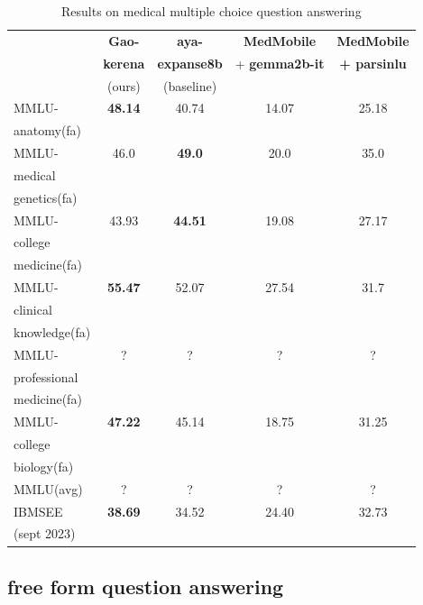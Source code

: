 \documentclass[conference]{IEEEtran}
\begin{document}
\begin{table}[ht]
	\centering
	\caption{Results on medical multiple choice question answering}
	\begin{tabular}{|l|c|c|c|c|}  %
		\hline
		\textbf{} & \textbf{Gao-} & \textbf{aya-}
		 & \textbf{MedMobile} & \textbf{MedMobile} \\ 
		 & \textbf{kerena} & \textbf{expanse8b} & + \textbf{gemma2b-it} & \textbf{+ parsinlu} \\
		 & (ours) & (baseline) &  &  \\ \hline
		MMLU- & \textbf{48.14} & 40.74 & 14.07 & 25.18 \\ 
		anatomy(fa) &  &  &  &  \\ \hline
		MMLU- & 46.0 & \textbf{49.0} & 20.0 & 35.0 \\
		medical &  &  &  &  \\ 
		genetics(fa) &  &  &  &  \\ \hline
		MMLU- & 43.93 & \textbf{44.51} & 19.08 & 27.17 \\
		college &  &  &  &  \\
		medicine(fa) &  &  &  &  \\ \hline
		MMLU- & \textbf{55.47} & 52.07 & 27.54 & 31.7 \\
		clinical&  &  &  &  \\
		knowledge(fa)&  &  &  &  \\ \hline
		MMLU- & ? & ? & ? & ? \\
        professional&  &  &  &  \\ 
        medicine(fa)&  &  &  &  \\ \hline
        MMLU- & \textbf{47.22} & 45.14 & 18.75 & 31.25 \\
        college&  &  &  &  \\
        biology(fa)&  &  &  &  \\ \hline
        MMLU(avg) & ? & ? & ? & ? \\ \hline
		IBMSEE & \textbf{38.69} & 34.52 & 24.40 & 32.73 \\ 
        (sept 2023) &  &  &  &  \\  \hline
	\end{tabular}
	\label{tab:model_results_on_mcqa}
\end{table}
\subsection{free form question answering}
\end{document}
